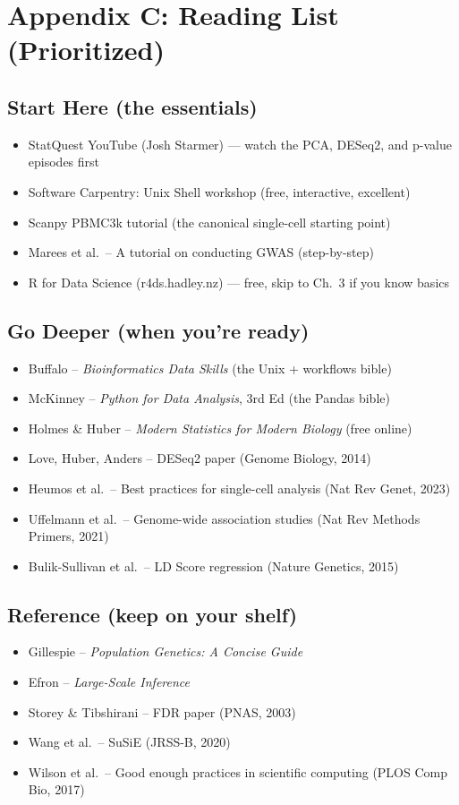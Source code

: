 \chapter{Appendix C: Reading List (Prioritized)}\label{app:reading}

\section{Start Here (the essentials)}
\begin{itemize}[nosep]
  \item StatQuest YouTube (Josh Starmer) --- watch the PCA, DESeq2, and p-value episodes first
  \item Software Carpentry: Unix Shell workshop (free, interactive, excellent)
  \item Scanpy PBMC3k tutorial (the canonical single-cell starting point)
  \item Marees et al.\ -- A tutorial on conducting GWAS (step-by-step)
  \item R for Data Science (r4ds.hadley.nz) --- free, skip to Ch.\ 3 if you know basics
\end{itemize}

\section{Go Deeper (when you're ready)}
\begin{itemize}[nosep]
  \item Buffalo -- \textit{Bioinformatics Data Skills} (the Unix + workflows bible)
  \item McKinney -- \textit{Python for Data Analysis}, 3rd Ed (the Pandas bible)
  \item Holmes \& Huber -- \textit{Modern Statistics for Modern Biology} (free online)
  \item Love, Huber, Anders -- DESeq2 paper (Genome Biology, 2014)
  \item Heumos et al.\ -- Best practices for single-cell analysis (Nat Rev Genet, 2023)
  \item Uffelmann et al.\ -- Genome-wide association studies (Nat Rev Methods Primers, 2021)
  \item Bulik-Sullivan et al.\ -- LD Score regression (Nature Genetics, 2015)
\end{itemize}

\section{Reference (keep on your shelf)}
\begin{itemize}[nosep]
  \item Gillespie -- \textit{Population Genetics: A Concise Guide}
  \item Efron -- \textit{Large-Scale Inference}
  \item Storey \& Tibshirani -- FDR paper (PNAS, 2003)
  \item Wang et al.\ -- SuSiE (JRSS-B, 2020)
  \item Wilson et al.\ -- Good enough practices in scientific computing (PLOS Comp Bio, 2017)
\end{itemize}

